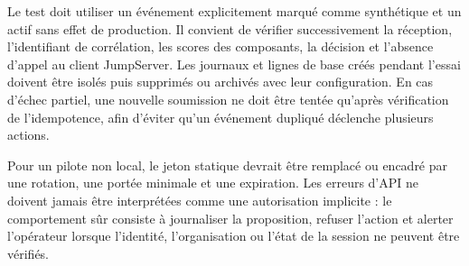\documentclass[11pt,a4paper,oneside]{report}
\theoremstyle{definition}
\theoremstyle{plain}
\begin{document}
Le test doit utiliser un événement explicitement marqué comme synthétique et
un actif sans effet de production. Il convient de vérifier successivement la
réception, l'identifiant de corrélation, les scores des composants, la décision
et l'absence d'appel au client JumpServer. Les journaux et lignes de base créés
pendant l'essai doivent être isolés puis supprimés ou archivés avec leur
configuration. En cas d'échec partiel, une nouvelle soumission ne doit être
tentée qu'après vérification de l'idempotence, afin d'éviter qu'un événement
dupliqué déclenche plusieurs actions.

Pour un pilote non local, le jeton statique devrait être remplacé ou encadré par
une rotation, une portée minimale et une expiration. Les erreurs d'API ne
doivent jamais être interprétées comme une autorisation implicite : le
comportement sûr consiste à journaliser la proposition, refuser l'action et
alerter l'opérateur lorsque l'identité, l'organisation ou l'état de la session
ne peuvent être vérifiés.
\end{document}

